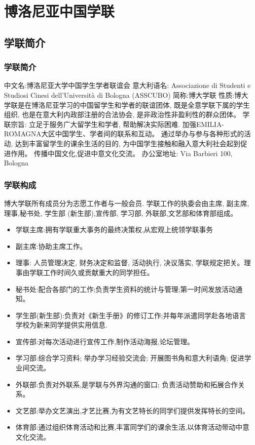 \documentclass[3pt,a5paper,openright,twoside]{book}
\begin{document}
% 
%
%
%

\chapter{博洛尼亚中国学联}              

\section{学联简介}

\subsection{学联简介}
中文名:博洛尼亚大学中国学生学者联谊会 
意大利语名: Associazione di Studenti e Studiosi Cinesi dell'Università di Bologna (ASSCUBO)
简称:博大学联
性质:博大学联是在博洛尼亚学习的中国留学生和学者的联谊团体, 既是全意学联下属的学生组织, 也是在意大利内政部注册的合法协会, 是非政治性非盈利性的群众团体。 
学联宗旨: 立足于服务广大留学生和学者, 帮助解决实际困难. 
加强EMILIA-ROMAGNA大区中国学生、学者间的联系和互动。 
通过举办与参与各种形式的活动, 达到丰富留学生的课余生活的目的, 为中国学生接触和融入意大利社会起到促进作用。 
 传播中国文化,促进中意文化交流。
办公室地址: Via Barbieri 100, Bologna


 

\subsection{学联构成}
博大学联所有成员分为志愿工作者与一般会员. 学联工作的执委会由主席, 副主席,理事,秘书处, 学生部 (新生部),宣传部, 学习部, 外联部,文艺部和体育部组成。
\begin{itemize}
\item 学联主席:拥有学联重大事务的最终决策权,从宏观上统领学联事务
\item 副主席:协助主席工作。 
\item 理事: 人员管理决定, 财务决定和监督, 活动执行, 决议落实, 学联规定把关。理事由学联工作时间久或贡献重大的同学担任。
\item 秘书处:配合各部门的工作;负责学生资料的统计与管理;第一时间发放活动通知。
\item 学生部(新生部):负责对《新生手册》的修订工作;并每年派遣同学赴各地语言学校为新来同学提供实用信息.
\item 宣传部:对每次活动进行宣传工作,制作活动海报,论坛管理。
\item 学习部:综合学习资料; 举办学习经验交流会; 开展图书角和意大利语角; 促进学业间交流。
\item 外联部:负责对外联系,是学联与外界沟通的窗口; 负责活动赞助和拓展合作关系。
\item 文艺部:举办文艺演出,才艺比赛,为有文艺特长的同学们提供发挥特长的空间。
\item 体育部:通过组织体育活动和比赛,丰富同学们的课余生活,以体育活动带动中意文化交流。 
\end{itemize}
\end{document}
